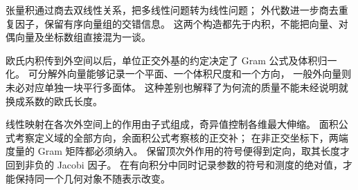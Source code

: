 





\begin{chaptersummary}
张量积通过商去双线性关系，把多线性问题转为线性问题；
外代数进一步商去重复因子，保留有序向量组的交错信息。
这两个构造都先于内积，不能把向量、对偶向量及坐标数组直接混为一谈。

\ProseParagraphBreak

欧氏内积传到外空间以后，单位正交外基的约定决定了 Gram 公式及体积归一化。
可分解外向量能够记录一个平面、一个体积尺度和一个方向，
一般外向量则未必对应单独一块平行多面体。
这种差别也解释了为何流的质量不能未经说明就换成系数的欧氏长度。

\ProseParagraphBreak

线性映射在各次外空间上的作用由子式组成，奇异值控制各维最大伸缩。
面积公式考察定义域的全部方向，余面积公式考察核的正交补；
在非正交坐标下，两端度量的 Gram 矩阵都必须纳入。
保留顶次外作用的符号便得到定向，取其长度才回到非负的 Jacobi 因子。
在有向积分中同时记录参数的符号和测度的绝对值，才能保持同一个几何对象不随表示改变。
\end{chaptersummary}

\BookExercises

